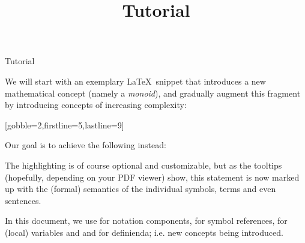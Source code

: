 \documentclass[lang={en,de}]{stex}
\begin{document}
\iffalse
\begin{dangerbox} foo \end{dangerbox}
\begin{mmtbox} foo \end{mmtbox}
\begin{sparagraph}[style={defibox,symdoc}]
  foo
\end{sparagraph}
\fi

\ifinputref
  \begin{sfragment}{Tutorial}
\else
  \title{\sTeX Tutorial}
  \maketitle
  \tableofcontents\bigskip
\fi


    We will start with an exemplary \LaTeX\ snippet that introduces
    a new mathematical concept (namely a \emph{monoid}), and gradually
    augment this fragment by introducing \sTeX concepts of
    increasing complexity:

    [gobble=2,firstline=5,lastline=9]

    Our goal is to achieve the following instead:

    \begin{sexample}
      \begin{framed}\end{framed}
    \end{sexample}
    The highlighting is of course optional and customizable, but
    as the tooltips (hopefully, depending on your PDF viewer)
    show, this statement is now marked up with the (formal)
    semantics of the individual symbols, terms and even sentences.

    \ifstexhtml\else
      In this document, we use  for notation
      components,  for symbol references,
       for (local) variables and
      and  for definienda; i.e.
      new concepts being introduced. 
    \fi
    

  \ifinputref\end{sfragment}\fi
  
\end{document}
